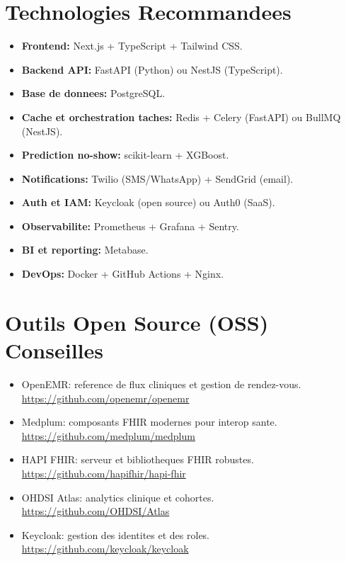 \documentclass[11pt,a4paper]{article}
\begin{document}
\section*{Technologies Recommandees}
\begin{itemize}[leftmargin=*]
  \item \textbf{Frontend:} Next.js + TypeScript + Tailwind CSS.
  \item \textbf{Backend API:} FastAPI (Python) ou NestJS (TypeScript).
  \item \textbf{Base de donnees:} PostgreSQL.
  \item \textbf{Cache et orchestration taches:} Redis + Celery (FastAPI) ou BullMQ (NestJS).
  \item \textbf{Prediction no-show:} scikit-learn + XGBoost.
  \item \textbf{Notifications:} Twilio (SMS/WhatsApp) + SendGrid (email).
  \item \textbf{Auth et IAM:} Keycloak (open source) ou Auth0 (SaaS).
  \item \textbf{Observabilite:} Prometheus + Grafana + Sentry.
  \item \textbf{BI et reporting:} Metabase.
  \item \textbf{DevOps:} Docker + GitHub Actions + Nginx.
\end{itemize}

\section*{Outils Open Source (OSS) Conseilles}
\begin{itemize}[leftmargin=*]
  \item OpenEMR: reference de flux cliniques et gestion de rendez-vous. \\
  \url{https://github.com/openemr/openemr}
  \item Medplum: composants FHIR modernes pour interop sante. \\
  \url{https://github.com/medplum/medplum}
  \item HAPI FHIR: serveur et bibliotheques FHIR robustes. \\
  \url{https://github.com/hapifhir/hapi-fhir}
  \item OHDSI Atlas: analytics clinique et cohortes. \\
  \url{https://github.com/OHDSI/Atlas}
  \item Keycloak: gestion des identites et des roles. \\
  \url{https://github.com/keycloak/keycloak}
\end{itemize}
\end{document}

